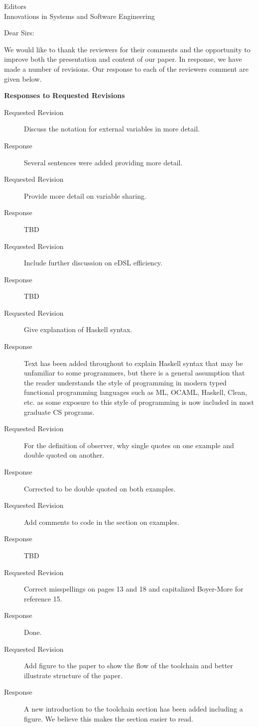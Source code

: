 \documentclass{letter}
\begin{document}
   \begin{letter}{Editors \\ Innovations in Systems and Software Engineering} 
   \opening{Dear Sirs:}

    We would like to thank the reviewers for their comments and the
    opportunity to improve both the presentation and content of our
    paper.  In response, we have made a number of revisions.  Our response to each of the reviewers comment are given below.


{\bf Responses to Requested Revisions}
\begin{description}
\item[Requested Revision] Discuss the notation for external variables in more detail. 
\item[Response] Several sentences were added providing more detail.
\item[Requested Revision] Provide more detail on variable sharing.
\item[Response] TBD
\item[Requested Revision] Include further discussion on eDSL efficiency. 
\item[Response] TBD
\item[Requested Revision] Give explanation of Haskell syntax.  
\item[Response] Text has been added throughout to explain Haskell syntax that may be unfamiliar to some programmers, but there is a general assumption that the reader understands the style of programming in modern typed functional programming languages such as ML, OCAML, Haskell, Clean, etc. as some exposure to this style of programming is now included in most graduate CS programs.
\item[Requested Revision] For the definition of observer, why single quotes on one example and double quoted on another.
\item[Response] Corrected to be double quoted on both examples.
\item[Requested Revision] Add comments to code in the section on examples.
\item[Response] TBD
\item[Requested Revision] Correct misspellings on pages 13 and 18 and capitalized Boyer-More for reference 15.
\item[Response] Done.
\item[Requested Revision] Add figure to the paper to show the flow of the toolchain and better illustrate structure of the paper.
\item[Response] A new introduction to the toolchain section has been added including a figure. We believe this makes the section easier to read.

\end{description}
\end{letter}
\end{document}
